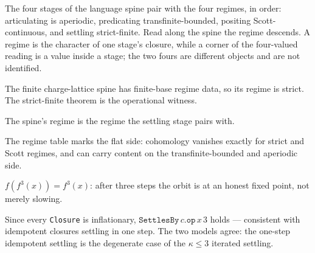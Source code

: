 \begin{definition}\label{thm:regime-stage}\leanok{}
The four stages of the language spine pair with the four regimes, in order:
articulating is aperiodic, predicating transfinite-bounded, positing
Scott-continuous, and settling strict-finite. Read along the spine the regime
descends. A regime is the character of one stage's closure, while a corner of
the four-valued reading is a value inside a stage; the two fours are different
objects and are not identified.
\end{definition}
\begin{proposition}\label{thm:spine-is-strict-regime}\leanok{}
The finite charge-lattice spine has finite-base regime data, so its regime is
strict.  The strict-finite theorem is the operational witness.
\end{proposition}
\begin{proposition}\label{thm:spine-settles-in-settling-regime}\leanok{}
The spine's regime is the regime the settling stage pairs with.
\end{proposition}
\begin{proposition}\label{thm:regime-cohomology-vanishes-iff}\leanok{}
The regime table marks the flat side: cohomology vanishes exactly for strict
and Scott regimes, and can carry content on the transfinite-bounded and
aperiodic side.
\end{proposition}
\begin{theorem}\label{thm:settled-fixed}\leanok{}
$f(f^3(x)) = f^3(x)$: after three steps the orbit is at an honest fixed point,
not merely slowing.
\end{theorem}
\begin{corollary}\label{cor:closure-strict-finite}\leanok{}
Since every \texttt{Closure} is inflationary, $\texttt{SettlesBy}\,c.\texttt{op}\,x\,3$
holds --- consistent with idempotent closures settling in one step. The two
models agree: the one-step idempotent settling is the degenerate case of the
$\kappa \le 3$ iterated settling.
\end{corollary}
